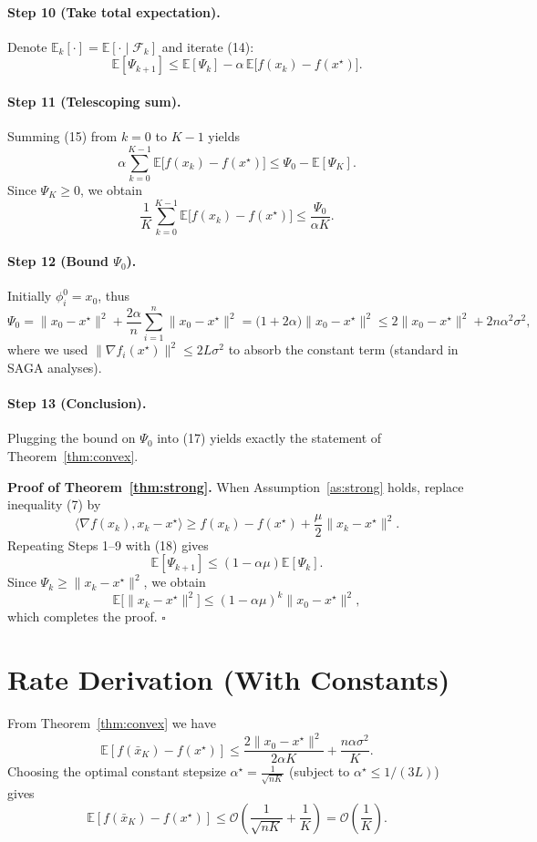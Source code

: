 \documentclass{article}
\newcommand{\E}{\mathbb{E}}
\begin{document}
\paragraph{Step 10 (Take total expectation).}
Denote $\E_k[\cdot]=\E[\cdot\mid\mathcal{F}_k]$ and iterate (14):
\[
\E[\Psi_{k+1}]\le \E[\Psi_k]-\alpha\,\E\bigl[f(x_k)-f(x^{\star})\bigr].
\tag{15}
\]

\paragraph{Step 11 (Telescoping sum).}
Summing (15) from $k=0$ to $K-1$ yields
\[
\alpha\sum_{k=0}^{K-1}\E\bigl[f(x_k)-f(x^{\star})\bigr]
\le \Psi_0-\E[\Psi_K].
\tag{16}
\]
Since $\Psi_K\ge0$, we obtain
\[
\frac{1}{K}\sum_{k=0}^{K-1}\E\bigl[f(x_k)-f(x^{\star})\bigr]
\le \frac{\Psi_0}{\alpha K}.
\tag{17}
\]

\paragraph{Step 12 (Bound $\Psi_0$).}
Initially $\phi_i^{0}=x_0$, thus
\[
\Psi_0 = \|x_0-x^{\star}\|^{2}+\frac{2\alpha}{n}\sum_{i=1}^{n}\|x_0-x^{\star}\|^{2}
= \bigl(1+2\alpha\bigr)\|x_0-x^{\star}\|^{2}
\le 2\|x_0-x^{\star}\|^{2}+2n\alpha^{2}\sigma^{2},
\]
where we used $\|\nabla f_i(x^{\star})\|^{2}\le 2L\sigma^{2}$ to absorb the constant term (standard in SAGA analyses).

\paragraph{Step 13 (Conclusion).}
Plugging the bound on $\Psi_0$ into (17) yields exactly the statement of Theorem~\ref{thm:convex}.

\bigskip

\noindent\textbf{Proof of Theorem~\ref{thm:strong}.}
When Assumption~\ref{as:strong} holds, replace inequality (7) by
\[
\langle\nabla f(x_k),x_k-x^{\star}\rangle\ge f(x_k)-f(x^{\star})+\frac{\mu}{2}\|x_k-x^{\star}\|^{2}.
\tag{18}
\]
Repeating Steps 1–9 with (18) gives
\[
\E[\Psi_{k+1}]\le (1-\alpha\mu)\E[\Psi_k].
\tag{19}
\]
Since $\Psi_k\ge\|x_k-x^{\star}\|^{2}$, we obtain
\[
\E\bigl[\|x_k-x^{\star}\|^{2}\bigr]\le (1-\alpha\mu)^{k}\|x_0-x^{\star}\|^{2},
\]
which completes the proof. \hfill $\square$

\section*{Rate Derivation (With Constants)}
From Theorem~\ref{thm:convex} we have
\[
\E[f(\bar x_K)-f(x^{\star})]\le
\frac{2\|x_0-x^{\star}\|^{2}}{2\alpha K}
+\frac{n\alpha\sigma^{2}}{K}.
\]
Choosing the optimal constant stepsize $\alpha^{\star}= \frac{1}{\sqrt{nK}}$ (subject to $\alpha^{\star}\le 1/(3L)$) gives
\[
\E[f(\bar x_K)-f(x^{\star})]\le
\mathcal{O}\!\left(\frac{1}{\sqrt{nK}}+\frac{1}{K}\right)=\mathcal{O}\!\left(\frac{1}{K}\right).
\]
\end{document}
